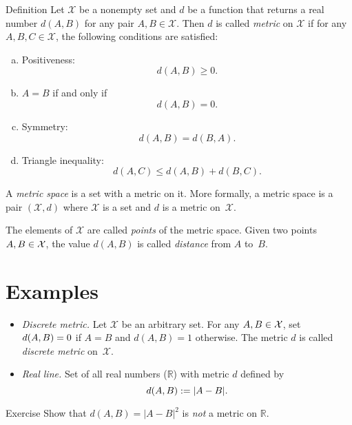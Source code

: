 \begin{thm}{Definition}\label{def:metric-space}
Let $\mathcal X$ be a nonempty set and 
$d$ be a function
that returns a real number $d(A,B)$
for any pair $A,B\in\mathcal X$.
Then $d$
is called \emph{metric} on 
$\mathcal X$ if for any
$A,B,C\in \mathcal X$, the following conditions are satisfied:
\begin{enumerate}[(a)]
\item\label{def:metric-space:a} Positiveness: 
$$d(A,B)\ge 0.$$
\item\label{def:metric-space:b} $A=B$ if and only if 
$$d(A,B)=0.$$
\item\label{def:metric-space:c} Symmetry: $$d(A, B) = d(B, A).$$
\item\label{def:metric-space:d} Triangle inequality: 
$$d(A, C) \le d(A, B) + d(B, C).$$
\end{enumerate}
A \emph{metric space} is a set with a metric on it. 
More formally, a metric space is a pair $(\mathcal X, d)$ where $\mathcal X$ is a set and $d$ is a metric on~$\mathcal X$.

The elements of $\mathcal X$ are called \emph{points} of the metric space.
Given two points $A,B\z\in \mathcal X$, 
the value $d(A, B)$ is called \emph{distance} from $A$ to~$B$.
\end{thm}

\section*{Examples}

\begin{itemize}
\item {}\emph{Discrete metric.} Let $\mathcal X$ be an arbitrary set. 
For any $A,B\z\in\mathcal X$, 
set $d(A,B)\z=0$ if $A=B$ and $d(A,B)=1$ otherwise.
The metric $d$ is called \emph{discrete metric} on~$\mathcal X$.
\item{}\emph{Real line.}
Set of all real numbers ($\mathbb{R}$) with metric $d$ defined by 
$$d(A,B):=|A-B|.$$
\end{itemize}

\begin{thm}{Exercise}\label{ex:dist-square}
Show that $d(A,B)=|A-B|^2$ is {}\emph{not} a metric on $\mathbb{R}$.
\end{thm}

